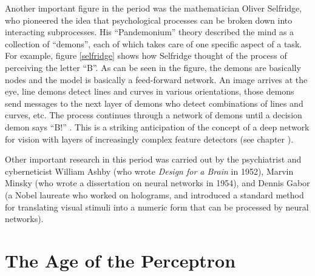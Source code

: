 Another important figure in the period was the mathematician Oliver Selfridge, who pioneered the idea that psychological processes can be broken down into interacting subprocesses. His ``Pandemonium'' theory described the mind as a collection of ``demons'', each of which takes care of one specific aspect of a task. For example, figure \ref{selfridge} shows how Selfridge thought of the process of perceiving the letter ``B''. As can be seen in the figure, the demons are basically nodes and the model is basically a feed-forward network. An image arrives at the eye, line demons detect lines and curves in various orientations, those demons send messages to the next layer of demons who detect combinations of lines and curves, etc. The process continues through a network of demons until a decision demon says ``B!'' \cite{selfridge1958pandemonium}.  This is a striking anticipation of the concept of a deep network for vision with layers of increasingly complex feature detectors (see chapter ).

Other important research in this period was carried out by the psychiatrist and cyberneticist William Ashby (who wrote \emph{Design for a Brain} in 1952), Marvin Minsky (who wrote a dissertation on neural networks in 1954), and Dennis Gabor (a Nobel laureate who worked on holograms, and introduced a standard method for translating visual stimuli into a numeric form that can be processed by neural networks).

\section{The Age of the Perceptron}\label{ageOfPerceptron}

